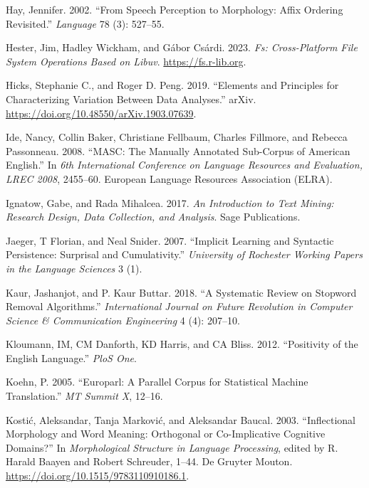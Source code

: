 \documentclass[
  letterpaper,
  DIV=11,
  numbers=noendperiod]{scrreport}
\newlength{\cslhangindent}
\newlength{\cslentryspacingunit} %
\newenvironment{CSLReferences}[2] %
 {%
  \setlength{\parindent}{0pt}
  \ifodd #1
  \let\oldpar\par
  \def\par{\hangindent=\cslhangindent\oldpar}
  \fi
  \setlength{\parskip}{#2\cslentryspacingunit}
 }%
 {}
\theoremstyle{definition}
\theoremstyle{remark}
\begin{document}
\begin{CSLReferences}{1}{0}
\leavevmode{}%
Hay, Jennifer. 2002. {``From Speech Perception to Morphology: Affix
Ordering Revisited.''} \emph{Language} 78 (3): 527--55.

\leavevmode{}%
Hester, Jim, Hadley Wickham, and Gábor Csárdi. 2023. \emph{Fs:
Cross-Platform File System Operations Based on Libuv}.
\url{https://fs.r-lib.org}.

\leavevmode{}%
Hicks, Stephanie C., and Roger D. Peng. 2019. {``Elements and Principles
for Characterizing Variation Between Data Analyses.''} arXiv.
\url{https://doi.org/10.48550/arXiv.1903.07639}.

\leavevmode{}%
Ide, Nancy, Collin Baker, Christiane Fellbaum, Charles Fillmore, and
Rebecca Passonneau. 2008. {``MASC: The Manually Annotated Sub-Corpus of
American English.''} In \emph{6th International Conference on Language
Resources and Evaluation, LREC 2008}, 2455--60. European Language
Resources Association (ELRA).

\leavevmode{}%
Ignatow, Gabe, and Rada Mihalcea. 2017. \emph{An Introduction to Text
Mining: Research Design, Data Collection, and Analysis}. Sage
Publications.

\leavevmode{}%
Jaeger, T Florian, and Neal Snider. 2007. {``Implicit Learning and
Syntactic Persistence: Surprisal and Cumulativity.''} \emph{University
of Rochester Working Papers in the Language Sciences} 3 (1).

\leavevmode{}%
Kaur, Jashanjot, and P. Kaur Buttar. 2018. {``A Systematic Review on
Stopword Removal Algorithms.''} \emph{International Journal on Future
Revolution in Computer Science \& Communication Engineering} 4 (4):
207--10.

\leavevmode{}%
Kloumann, IM, CM Danforth, KD Harris, and CA Bliss. 2012. {``Positivity
of the English Language.''} \emph{PloS One}.

\leavevmode{}%
Koehn, P. 2005. {``Europarl: A Parallel Corpus for Statistical Machine
Translation.''} \emph{MT Summit X}, 12--16.

\leavevmode{}%
Kostić, Aleksandar, Tanja Marković, and Aleksandar Baucal. 2003.
{``Inflectional Morphology and Word Meaning: Orthogonal or
Co-Implicative Cognitive Domains?''} In \emph{Morphological Structure in
Language Processing}, edited by R. Harald Baayen and Robert Schreuder,
1--44. De Gruyter Mouton. \url{https://doi.org/10.1515/9783110910186.1}.


\end{CSLReferences}
\end{document}
